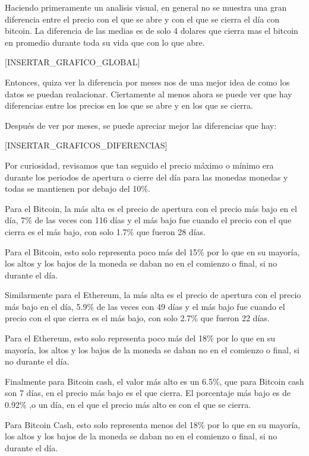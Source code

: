 \documentclass[12pt,letterpaper]{article}
\begin{document}
    Haciendo primeramente un analisis visual, en general no se muestra una gran diferencia entre el precio con el que se abre y con el que se cierra el día con bitcoin. La diferencia de las medias es de solo 4 dolares que cierra mas el bitcoin en promedio durante toda su vida que con lo que abre.
    
    [INSERTAR_GRAFICO_GLOBAL] 
    
    Entonces, quiza ver la diferencia por meses nos de una mejor idea de como los datos se puedan realacionar.
    Ciertamente al menos ahora se puede ver que hay diferencias entre los precios en los que se abre y en los que se cierra.

    Después de ver por meses, se puede apreciar mejor las diferencias que hay:

    [INSERTAR_GRAFICOS_DIFERENCIAS]


    Por curiosidad, revisamos que tan seguido el precio máximo o mínimo era durante los periodos de apertura o cierre del día para las monedas monedas y todas se mantienen por debajo del 10\%.

    Para el Bitcoin, la más alta es el precio de apertura con el precio más bajo en el día, 7\% de las veces con 116 días y el más bajo fue cuando el precio con el que cierra es el más bajo, con solo 1.7\% que fueron 28 días.

    Para el Bitcoin, esto solo representa poco más del 15\% por lo que en su mayoría, los altos y los bajos de la moneda se daban no en el comienzo o final, si no durante el día.



    Similarmente para el Ethereum, la más alta es el precio de apertura con el precio más bajo en el día, 5.9\% de las veces con 49 días y el más bajo fue cuando el precio con el que cierra es el más bajo, con solo 2.7\% que fueron 22 días.

    Para el Ethereum, esto solo representa poco más del 18\% por lo que en su mayoría, los altos y los bajos de la moneda se daban no en el comienzo o final, si no durante el día.



    Finalmente para Bitcoin cash, el valor más alto es un 6.5\%, que para Bitcoin cash son 7 días, en el precio más bajo es el que cierra. El porcentaje más bajo es de 0.92\% ,o un día, en el que el precio más alto es con el que se cierra.
    
    Para Bitcoin Cash, esto solo representa menos del 18\% por lo que en su mayoría, los altos y los bajos de la moneda se daban no en el comienzo o final, si no durante el día.
\end{document}
